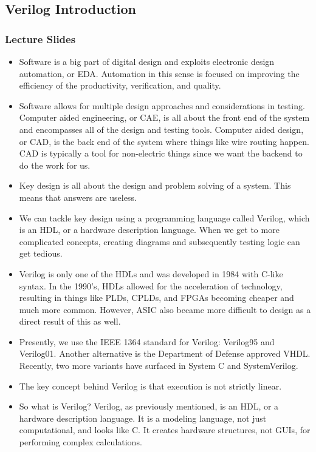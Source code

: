 \documentclass[10pt,a4paper]{article}
\begin{document}
\subsection{Verilog Introduction}
\subsubsection{Lecture Slides}
\begin{itemize}
\item Software is a big part of digital design and exploits electronic design automation, or EDA. Automation in this sense is focused on improving the efficiency of the productivity, verification, and quality. 
\item Software allows for multiple design approaches and considerations in testing. Computer aided engineering, or CAE, is all about the front end of the system and encompasses all of the design and testing tools. Computer aided design, or CAD, is the back end of the system where things like wire routing happen. CAD is typically a tool for non-electric things since we want the backend to do the work for us. 
\item Key design is all about the design and problem solving of a system. This means that answers are useless.
\item We can tackle key design using a programming language called Verilog, which is an HDL, or a hardware description language. When we get to more complicated concepts, creating diagrams and subsequently testing logic can get tedious. 
\item Verilog is only one of the HDLs and was developed in  1984 with C-like syntax. In the 1990's, HDLs allowed for the acceleration of technology, resulting in things like PLDs, CPLDs, and FPGAs becoming cheaper and much more common. However, ASIC also became more difficult to design as a direct result of this as well. 
\item Presently, we use the IEEE 1364 standard for Verilog: Verilog95 and Verilog01. Another alternative is the Department of Defense approved VHDL. Recently, two more variants have surfaced in System C and SystemVerilog. 
\item The key concept behind Verilog is that execution is not strictly linear. 
\item So what is Verilog? Verilog, as previously mentioned, is an HDL, or a hardware description language. It is a modeling language, not just computational, and looks like C. It creates hardware structures, not GUIs, for performing complex calculations.

\end{itemize}
\end{document}
